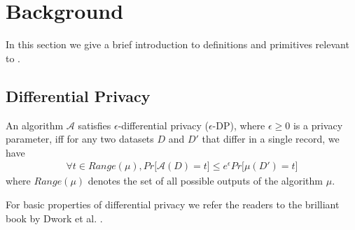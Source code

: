 
\section{Background}
In this section we give a brief introduction to definitions and primitives relevant to \system. 

\subsection{Differential Privacy}
\begin{definition} An algorithm $\mathcal{A}$
satisfies $\epsilon$-differential privacy ($\epsilon$-DP), where $\epsilon \geq 0$ is a privacy parameter, iff
 for any two datasets $D$ and $D'$ that differ in a single record, we have
\begin{gather}
\forall t \in Range(\mu), Pr \big[\mathcal{A}(D) = t\big] \leq e^{\epsilon}Pr\big[\mu(D') = t\big]
\end{gather}
where $Range(\mu)$ denotes the set of all possible outputs
of the algorithm $\mu$.
\end{definition} 
For basic properties of differential privacy we refer the readers to the brilliant book by Dwork et al. \cite{Dork}.
